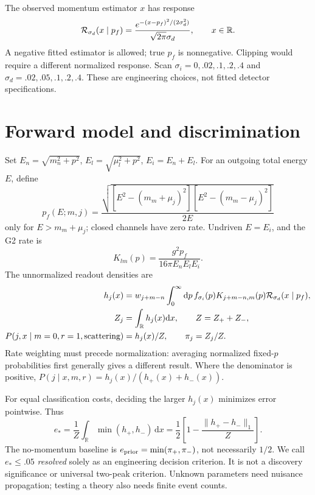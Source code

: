 \documentclass[11pt,a4paper]{article}
\newcommand{\dd}{\mathrm d}
\begin{document}
The observed momentum estimator $x$ has response
\begin{equation}\label{eq:response}
 {\cal R}_{\sigma_d}(x\mid p_f)=
 \frac{e^{-(x-p_f)^2/(2\sigma_d^2)}}{\sqrt{2\pi}\sigma_d},
 \qquad x\in\mathbb R .
\end{equation}
A negative fitted estimator is allowed; true $p_f$ is nonnegative.
Clipping would require a different normalized response.
Scan $\sigma_i=0,.02,.1,.2,.4$ and $\sigma_d=.02,.05,.1,.2,.4$.
These are engineering choices, not fitted detector specifications.

\section{Forward model and discrimination}
Set $E_n=\sqrt{m_n^2+p^2}$, $E_l=\sqrt{\mu_l^2+p^2}$,
$E_i=E_n+E_l$. For an outgoing total energy $E$, define
\begin{equation}\label{eq:pf}
 p_f(E;m,j)=
 \frac{\sqrt{[E^2-(m_m+\mu_j)^2][E^2-(m_m-\mu_j)^2]}}{2E}
\end{equation}
only for $E>m_m+\mu_j$; closed channels have zero rate.
Undriven $E=E_i$, and the G2 rate is
\begin{equation}\label{eq:K}
 K_{lm}(p)=\frac{g^2p_f}{16\pi E_nE_lE_i}.
\end{equation}
The unnormalized readout densities are
\begin{align}
 h_j(x)&=w_{j+m-n}\int_0^\infty \dd p\,
 f_{\sigma_i}(p)K_{j+m-n,m}(p)
 {\cal R}_{\sigma_d}(x\mid p_f),\\
 Z_j&=\int_{\mathbb R}h_j(x)\dd x,\qquad Z=Z_++Z_-,\\
 P(j,x\mid m=0,r=1,\text{scattering})&=h_j(x)/Z,\qquad
 \pi_j=Z_j/Z .
\end{align}
Rate weighting must precede normalization: averaging normalized
fixed-$p$ probabilities first generally gives a different result.
Where the denominator is positive,
$P(j\mid x,m,r)=h_j(x)/(h_+(x)+h_-(x))$.

For equal classification costs, deciding the larger $h_j(x)$ minimizes
error pointwise. Thus
\begin{equation}\label{eq:bayes}
 \boxed{e_*=\frac1Z\int_{\mathbb R}\min(h_+,h_-)\,\dd x
 =\frac12\left[1-\frac{\|h_+-h_-\|_1}{Z}\right].}
\end{equation}
The no-momentum baseline is $e_{\rm prior}=\min(\pi_+,\pi_-)$,
not necessarily $1/2$. We call $e_*\leq .05$ \emph{resolved} solely
as an engineering decision criterion. It is not a discovery
significance or universal two-peak criterion. Unknown parameters need
nuisance propagation; testing a theory also needs finite event counts.
\end{document}
